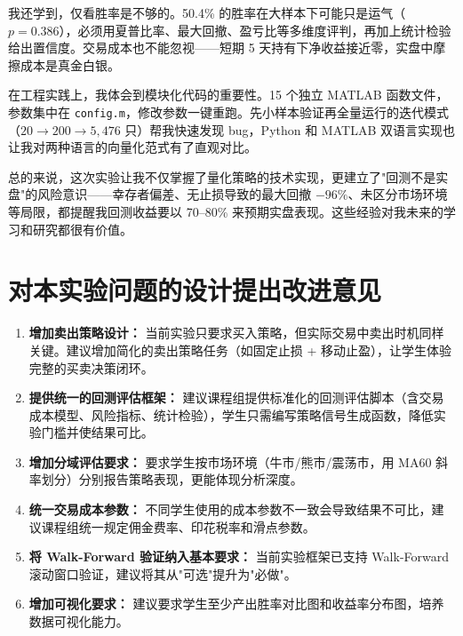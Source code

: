 \documentclass[12pt,a4paper]{ctexart}
\numberwithin{figure}{section}
\numberwithin{table}{section}
\begin{document}
我还学到，仅看胜率是不够的。50.4\% 的胜率在大样本下可能只是运气（$p = 0.386$），必须用夏普比率、最大回撤、盈亏比等多维度评判，再加上统计检验给出置信度。交易成本也不能忽视——短期 5 天持有下净收益接近零，实盘中摩擦成本是真金白银。

在工程实践上，我体会到模块化代码的重要性。15 个独立 MATLAB 函数文件，参数集中在 \texttt{config.m}，修改参数一键重跑。先小样本验证再全量运行的迭代模式（$20 \to 200 \to 5{,}476$ 只）帮我快速发现 bug，Python 和 MATLAB 双语言实现也让我对两种语言的向量化范式有了直观对比。

总的来说，这次实验让我不仅掌握了量化策略的技术实现，更建立了"回测不是实盘"的风险意识——幸存者偏差、无止损导致的最大回撤 $-96\%$、未区分市场环境等局限，都提醒我回测收益要以 70--80\% 来预期实盘表现。这些经验对我未来的学习和研究都很有价值。

\section{对本实验问题的设计提出改进意见}

\begin{enumerate}[leftmargin=*]
    \item {\bfseries 增加卖出策略设计：} 当前实验只要求买入策略，但实际交易中卖出时机同样关键。建议增加简化的卖出策略任务（如固定止损 + 移动止盈），让学生体验完整的买卖决策闭环。
    \item {\bfseries 提供统一的回测评估框架：} 建议课程组提供标准化的回测评估脚本（含交易成本模型、风险指标、统计检验），学生只需编写策略信号生成函数，降低实验门槛并使结果可比。
    \item {\bfseries 增加分域评估要求：} 要求学生按市场环境（牛市/熊市/震荡市，用 MA60 斜率划分）分别报告策略表现，更能体现分析深度。
    \item {\bfseries 统一交易成本参数：} 不同学生使用的成本参数不一致会导致结果不可比，建议课程组统一规定佣金费率、印花税率和滑点参数。
    \item {\bfseries 将 Walk-Forward 验证纳入基本要求：} 当前实验框架已支持 Walk-Forward 滚动窗口验证，建议将其从"可选"提升为"必做"。
    \item {\bfseries 增加可视化要求：} 建议要求学生至少产出胜率对比图和收益率分布图，培养数据可视化能力。
\end{enumerate}
\end{document}
